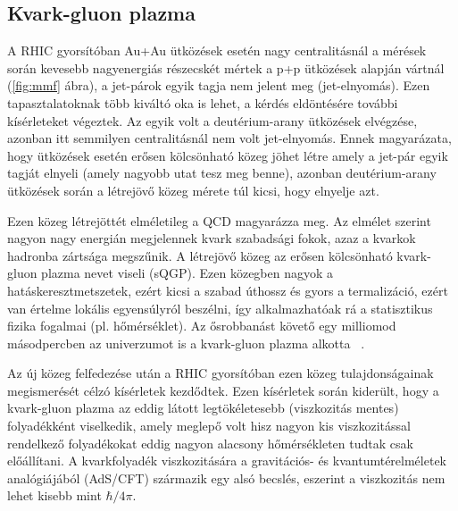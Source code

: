 \documentclass[11pt,a4paper]{article}
\numberwithin{equation}{subsection}
\numberwithin{figure}{section}
\begin{document}
\subsection{Kvark-gluon plazma}

A RHIC gyorsítóban Au+Au ütközések esetén nagy centralitásnál a mérések során kevesebb nagyenergiás részecskét mértek a p+p ütközések alapján vártnál (\ref{fig:mmf} ábra), a jet-párok egyik tagja nem jelent meg (jet-elnyomás). Ezen tapasztalatoknak több kiváltó oka is lehet, a kérdés eldöntésére további kísérleteket végeztek. Az egyik volt a deutérium-arany ütközések elvégzése, azonban itt semmilyen centralitásnál nem volt jet-elnyomás. Ennek magyarázata, hogy ütközések esetén erősen kölcsönható közeg jöhet létre amely a jet-pár egyik tagját elnyeli (amely nagyobb utat tesz meg benne), azonban deutérium-arany ütközések során a létrejövő közeg mérete túl kicsi, hogy elnyelje azt.

Ezen közeg létrejöttét elméletileg a QCD magyarázza meg. Az elmélet szerint nagyon nagy energián megjelennek kvark szabadsági fokok, azaz a kvarkok hadronba zártsága megszűnik. A létrejövő közeg az erősen kölcsönható kvark-gluon plazma nevet viseli (sQGP). Ezen közegben nagyok a hatáskeresztmetszetek, ezért kicsi a szabad úthossz és gyors a termalizáció, ezért van értelme lokális egyensúlyról beszélni, így alkalmazhatóak rá a statisztikus fizika fogalmai (pl. hőmérséklet). Az ősrobbanást követő egy milliomod másodpercben az univerzumot is a kvark-gluon plazma alkotta ~\cite{SWeinberg}.

Az új közeg felfedezése után a RHIC gyorsítóban ezen közeg tulajdonságainak megismerését célzó kísérletek kezdődtek. Ezen kísérletek során kiderült, hogy a kvark-gluon plazma az eddig látott legtökéletesebb (viszkozitás mentes) folyadékként viselkedik, amely meglepő volt hisz nagyon kis viszkozitással rendelkező folyadékokat eddig nagyon alacsony hőmérsékleten tudtak csak előállítani. A kvarkfolyadék viszkozitására a gravitációs- és kvantumtérelméletek analógiájából (AdS/CFT) származik egy alsó becslés, eszerint a viszkozitás nem lehet kisebb mint $\hbar/4\pi$.
\end{document}
